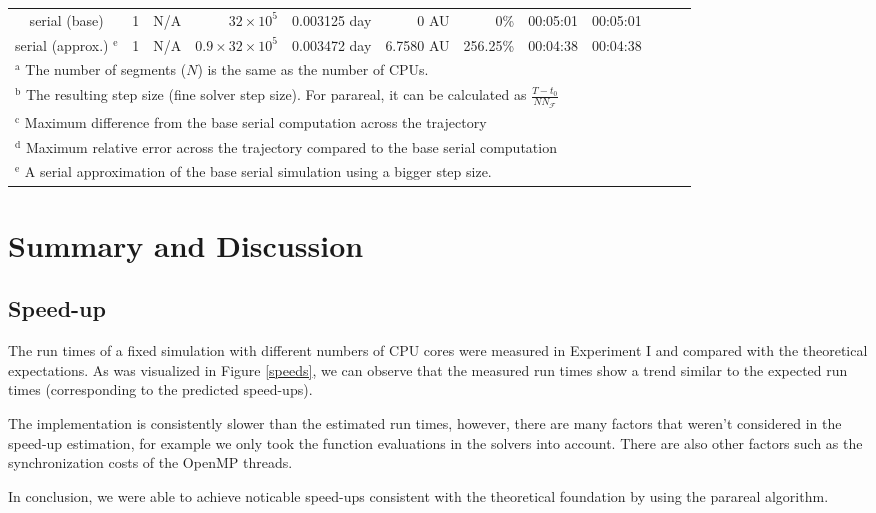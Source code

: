 \documentclass[conference]{IEEEtran}
\begin{document}
\begin{table*}[htbp]
\begin{center}
\begin{tabular}{crrrrrrrrrcc}
serial (base) & 1 & N/A & $32\times10^5$ & 0.003125 day & 0 AU & 0\% & 00:05:01 & 00:05:01 \\
serial (approx.) $^{\mathrm{e}}$ & 1 & N/A & $0.9\times32\times10^5$ & 0.003472 day & 6.7580 AU & 256.25\% & 00:04:38 & 00:04:38 \\
\bottomrule
\multicolumn{8}{l}{$^{\mathrm{a}}$ The number of segments ($N$) is the same as the number of CPUs.} \\
\multicolumn{8}{l}{$^{\mathrm{b}}$ The resulting step size (fine solver step size). For parareal, it can be calculated as $\frac{T-t_0}{NN_\mathcal{F}}$} \\
\multicolumn{8}{l}{$^{\mathrm{c}}$ Maximum difference from the base serial computation across the trajectory} \\
\multicolumn{8}{l}{$^{\mathrm{d}}$ Maximum relative error across the trajectory compared to the base serial computation} \\
\multicolumn{8}{l}{$^{\mathrm{e}}$ A serial approximation of the base serial simulation using a bigger step size.}
\end{tabular}
\label{runtimes}
\end{center}
\end{table*}

\section{Summary and Discussion}

\subsection{Speed-up}
The run times of a fixed simulation with different numbers of CPU cores were measured in Experiment I and compared with the theoretical expectations. As was visualized in Figure \ref{speeds}, we can observe that the measured run times show a trend similar to the expected run times (corresponding to the predicted speed-ups). 

The implementation is consistently slower than the estimated run times, however, there are many factors that weren't considered in the speed-up estimation, for example we only took the function evaluations in the solvers into account. There are also other factors such as the synchronization costs of the OpenMP threads.

In conclusion, we were able to achieve noticable speed-ups consistent with the theoretical foundation by using the parareal algorithm.
\end{document}
